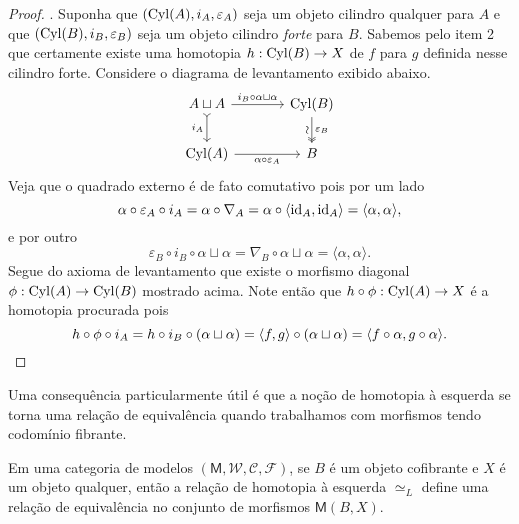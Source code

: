 \begin{proof}
  . Suponha que $(\mathrm{Cyl}(A),i_{A},\varepsilon_{A})$ seja um objeto cilindro qualquer para $A$ e que $(\mathrm{Cyl}(B),i_{B},\varepsilon_{B})$ seja um objeto cilindro \emph{forte} para $B$.
  Sabemos pelo item 2 que certamente existe uma homotopia $h: \mathrm{Cyl}(B) \to X$ de $f$ para $g$ definida nesse cilindro forte.
  Considere o diagrama de levantamento exibido abaixo.
  \begin{displaymath}
    \begin{tikzcd}[column sep=1.25cm]
      A \sqcup A
      \arrow[r, "{i_{B} \circ \alpha \sqcup \alpha}"]
      \arrow[d, tail, "i_{A}" swap]
      & \Cyl(B)
      \arrow[d, two heads, "\varepsilon_{B}", "\sim" {swap,sloped}]
      \\ \Cyl(A)
      \arrow[r, "\alpha \circ \varepsilon_{A}" swap]
      & B
    \end{tikzcd}
  \end{displaymath}
  Veja que o quadrado externo é de fato comutativo pois por um lado
  \begin{displaymath}
    \alpha \circ \varepsilon_{A} \circ i_{A} = \alpha \circ \nabla_{A} = \alpha \circ \langle \mathrm{id}_{A},\mathrm{id}_{A} \rangle = \langle \alpha,\alpha \rangle,
  \end{displaymath}
  e por outro
  \begin{displaymath}
    \varepsilon_{B} \circ i_{B} \circ \alpha \sqcup \alpha = \nabla_{B} \circ \alpha \sqcup \alpha = \langle \alpha,\alpha \rangle.
  \end{displaymath}
  Segue do axioma de levantamento que existe o morfismo diagonal $\phi: \mathrm{Cyl}(A) \to \mathrm{Cyl}(B)$ mostrado acima.
  Note então que $h \circ \phi: \mathrm{Cyl}(A) \to X$ é a homotopia procurada pois
  \begin{displaymath}
    h \circ \phi \circ i_{A} = h \circ i_{B} \circ (\alpha \sqcup \alpha) = \langle f,g \rangle \circ (\alpha \sqcup \alpha) = \langle f \circ \alpha, g \circ \alpha \rangle. \qedhere
  \end{displaymath}
\end{proof}

Uma consequência particularmente útil é que a noção de homotopia à esquerda se torna uma relação de equivalência quando trabalhamos com morfismos tendo codomínio fibrante.

\begin{corol}\label{corol:homotopia_esquerda_rel_equiv_se_dom_cofib}
  Em uma categoria de modelos $(\mathsf{M},\mathcal{W},\mathcal{C},\mathcal{F})$, se $B$ é um objeto cofibrante e $X$ é um objeto qualquer, então a relação de homotopia à esquerda $\simeq_{L}$ define uma relação de equivalência no conjunto de morfismos $\mathsf{M}(B,X)$.
\end{corol}

